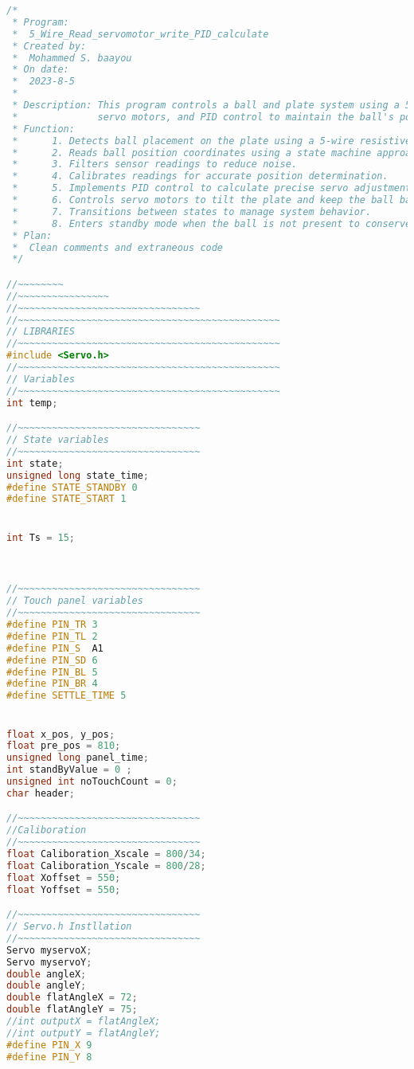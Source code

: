 \begin{lstlisting}[language=C++ , caption= Arduino full code for controlling the system by a simulink controller]
/*
 * Program:
 *  5_Wire_Read_servomotor_write_PID_calculate
 * Created by:
 *  Mohammed S. baayou
 * On date:
 *  2023-8-5
 * 
 * Description: This program controls a ball and plate system using a 5-wire touch panel,
 *              servo motors, and PID control to maintain the ball's position at the center.
 * Function:
 *      1. Detects ball placement on the plate using a 5-wire resistive touch panel.
 *      2. Reads ball position coordinates using a state machine approach.
 *      3. Filters sensor readings to reduce noise.
 *      4. Calibrates readings for accurate position determination.
 *      5. Implements PID control to calculate precise servo adjustments.
 *      6. Controls servo motors to tilt the plate and keep the ball balanced.
 *      7. Transitions between states to manage system behavior.
 *      8. Enters standby mode when the ball is not present to conserve energy.
 * Plan:
 *  Clean comments and extraneous code
 */

//~~~~~~~~
//~~~~~~~~~~~~~~~~
//~~~~~~~~~~~~~~~~~~~~~~~~~~~~~~~~
//~~~~~~~~~~~~~~~~~~~~~~~~~~~~~~~~~~~~~~~~~~~~~~
// LIBRARIES
//~~~~~~~~~~~~~~~~~~~~~~~~~~~~~~~~~~~~~~~~~~~~~~
#include <Servo.h>
//~~~~~~~~~~~~~~~~~~~~~~~~~~~~~~~~~~~~~~~~~~~~~~
// Variables
//~~~~~~~~~~~~~~~~~~~~~~~~~~~~~~~~~~~~~~~~~~~~~~
int temp;

//~~~~~~~~~~~~~~~~~~~~~~~~~~~~~~~~
// State variables
//~~~~~~~~~~~~~~~~~~~~~~~~~~~~~~~~
int state;
unsigned long state_time;
#define STATE_STANDBY 0
#define STATE_START 1


int Ts = 15;



//~~~~~~~~~~~~~~~~~~~~~~~~~~~~~~~~
// Touch panel variables
//~~~~~~~~~~~~~~~~~~~~~~~~~~~~~~~~
#define PIN_TR 3
#define PIN_TL 2
#define PIN_S  A1
#define PIN_SD 6
#define PIN_BL 5
#define PIN_BR 4
#define SETTLE_TIME 5


float x_pos, y_pos;
float pre_pos = 810;
unsigned long panel_time;
int standByValue = 0 ;
unsigned int noTouchCount = 0;
char header;

//~~~~~~~~~~~~~~~~~~~~~~~~~~~~~~~~
//Caliboration
//~~~~~~~~~~~~~~~~~~~~~~~~~~~~~~~~
float Caliboration_Xscale = 800/34;
float Caliboration_Yscale = 800/28;
float Xoffset = 550;
float Yoffset = 550;

//~~~~~~~~~~~~~~~~~~~~~~~~~~~~~~~~
// Servo.h Instllation 
//~~~~~~~~~~~~~~~~~~~~~~~~~~~~~~~~
Servo myservoX;
Servo myservoY;
double angleX;
double angleY;
double flatAngleX = 72;
double flatAngleY = 75;
//int outputX = flatAngleX;
//int outputY = flatAngleY;
#define PIN_X 9
#define PIN_Y 8


\end{lstlisting}
